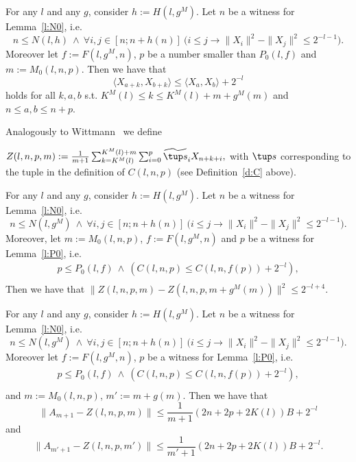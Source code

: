 \begin{lemma}\label{l:scpb}
For any $l$ and any $g$, consider $h:= H(l,g^M)$. Let
$n$ be a witness for Lemma~\ref{l:N0}, i.e. 
\[
n\leq N(l,h)\ \wedge\ \forall i,j\in[n;n+h(n)]\ 
\big( i\leq j\rightarrow \|X_i\|^2-\|X_j\|^2\leq 2^{-l-1} \big) . \tag{N} 
\]
Moreover let $f:=F(l,g^M,n)$,
$p$ be a number smaller than $P_0(l,f)$ 
and  $m:=M_0(l,n,p)$. Then we have that
\[ 
\langle X_{a+k},X_{b+k} \rangle \leq \langle X_{a},X_{b} \rangle + 2^{-l}
\]
holds for all $k,a,b$ s.t. $K^M(l)\leq k \leq K^M(l)+m+g^M(m)$ and $ n\leq a,b \leq n+p$.
\end{lemma} 

Analogously to Wittmann~\cite{Wittmann90} we define
\begin{dfn}[$Z$]\label{d:Z}
$Z(l,n,p,m):=\frac{1}{m+1}\sum^{K^M(l)+m}_{k=K^M(l)}\sum^{p}_{i=0}  \widetilde{\tup s}_i X_{n+k+i},$
with $\tup s$ corresponding to the tuple in the definition of $C(l,n,p)$ (see
Definition~\ref{d:C} above). 
\end{dfn}

\begin{lemma}\label{l:Zs}
For any $l$ and any $g$, consider $h:= H(l,g^M)$. Let
$n$ be a witness for Lemma~\ref{l:N0}, i.e. 
\[
n\leq N(l,g^M)\ \wedge\ \forall i,j\in[n;n+h(n)]\ 
\big( i\leq j\rightarrow \|X_i\|^2-\|X_j\|^2\leq 2^{-l-1} \big) . \tag{N} 
\]
Moreover, let $m:=M_0(l,n,p)$, $f:=F(l,g^M,n)$ and 
$p$ be a witness for Lemma~\ref{l:P0}, i.e. 
\begin{align*}
p\leq P_0(l,f)\ \wedge\ ( C(l,n,p)\leq C(l,n,f(p)) + 2^{-l}  ),  \tag{P}\\
\end{align*} 
Then we have that
$ \|Z(l,n,p,m) - Z( l,n,p,m+g^M(m) ) \|^2 \leq 2^{-l+4}.$
\end{lemma}

\begin{lemma}\label{l:ZA}
For any $l$ and any $g$, consider $h:= H(l,g^M)$. Let
$n$ be a witness for Lemma~\ref{l:N0}, i.e. 
\[
n\leq N(l,g^M)\ \wedge\ \forall i,j\in[n;n+h(n)]\ 
\big( i\leq j\rightarrow \|X_i\|^2-\|X_j\|^2\leq 2^{-l-1} \big) . \tag{N} 
\]
Moreover let $f:=F(l,g^M,n)$,
$p$ be a witness for Lemma~\ref{l:P0}, i.e. 
\begin{align*}
p\leq P_0(l,f)\ \wedge\ ( C(l,n,p)\leq C(l,n,f(p)) + 2^{-l}  ),  \tag{P}\\
\end{align*} 
and  $m:=M_0(l,n,p)$, $m':=m+g(m)$.
Then we have that
\[
 \|A_{m+1} - Z( l,n,p,m )\|\leq \frac{1}{m+1}(2n + 2p + 2K(l))B +2^{-l}
\]
and
\[
 \|A_{m'+1} - Z( l,n,p,m' )\|\leq \frac{1}{m'+1}(2n + 2p + 2K(l))B +2^{-l}.
\]
\end{lemma}



